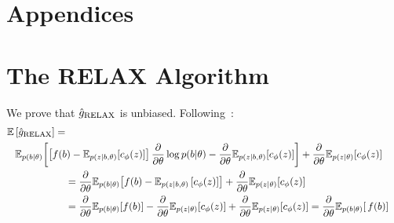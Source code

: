 \documentclass{article}
\newcommand{\discreteDist}{p(b|\theta)}
\newcommand{\loss}{f(b)}
\newcommand{\expectedLoss}{\mathbb{E}_{\discreteDist{}} \! \left[ \, \loss{} \right]}
\newcommand{\E}{\mathbb{E}}
\newcommand{\PT}{\frac{\partial}{\partial \theta}}
\begin{document}





\clearpage
\section*{Appendices}
\appendix




\section{The RELAX Algorithm}
\label{relax proof}

We prove that $\hat g_\textnormal{RELAX}$ is unbiased. Following~\cite{tucker2017rebar}:
%
\begin{align}
\E \left[ \hat g_\textnormal{RELAX} \right] = \\
\E_{p(b|\theta)} \! \left[\left[ f(b) - \E_{p(z|b, \theta)} \! \left[c_\phi(z) \right] \right]\PT \log p(b|\theta)  - \PT \E_{p(z|b, \theta)} \! \left[c_\phi(z) \right] \right] + \PT\E_{p(z|\theta)} \! \left[ c_\phi(z) \right] \span & \nonumber\\
&= \PT \E_{p(b|\theta)} \! \left[ f(b) - \E_{p(z|b, \theta)}\left[ c_\phi(z) \right]  \right] + \PT\E_{p(z|\theta)} \! \left[ c_\phi(z) \right]\nonumber\\
&= \PT \E_{p(b|\theta)} \! \left[ f(b) \right] - \PT\E_{p(z|\theta)} \! \left[ c_\phi(z) \right] + \PT\E_{p(z|\theta)} \! \left[ c_\phi(z) \right]
= \PT \expectedLoss{}%
\end{align}
%
\end{document}
